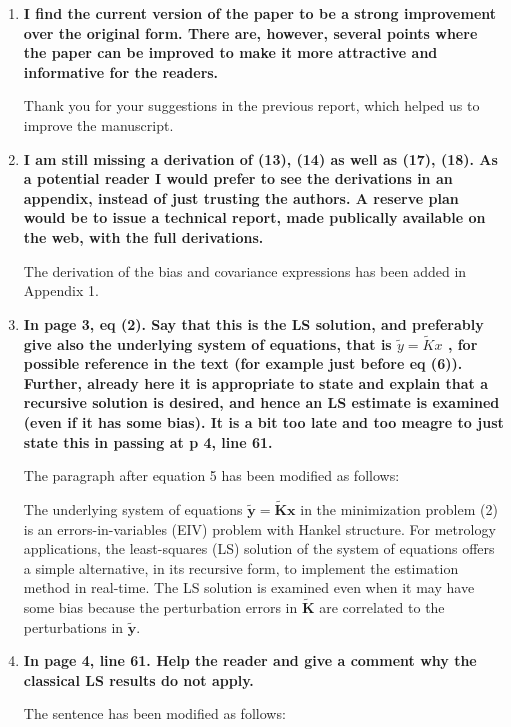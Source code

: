 \documentclass[11pt]{article}
\begin{document}
\begin{enumerate}


\item \textbf{I find the current version of the paper to be a strong improvement over the original form. There are, however, several points where the paper can be improved to make it more attractive and informative for the readers.}

Thank you for your suggestions in the previous report, which helped us to improve the manuscript.

\item \textbf{I am still missing a derivation of (13), (14) as well as (17), (18). As a potential
reader I would prefer to see the derivations in an appendix, instead of just
trusting the authors. A reserve plan would be to issue a technical report,
made publically available on the web, with the full derivations.}

The derivation of the bias and covariance expressions has been added in Appendix 1.

\item \textbf{In page 3, eq (2). Say that this is the LS solution, and preferably give also the underlying system of equations, that is $\tilde{y}=\tilde{K}x$ , for possible reference in the text (for example just before eq (6)). Further, already here it is appropriate to state and explain that a recursive solution is desired, and hence an LS estimate is examined (even if it has some bias). It is a bit too late and too meagre to just state this in passing at p 4, line 61.}

The paragraph after equation 5 has been modified as follows:

\color{blue} 
The underlying system of equations $\widetilde{\mathbf{y}} = \widetilde{\mathbf{K}} \mathbf{x}$ in the minimization problem (2)  is an errors-in-variables (EIV) problem with Hankel structure.
For metrology applications, the least-squares (LS) solution of the system of equations offers a simple alternative, in its recursive form, to implement the estimation method in real-time.
The LS solution is examined even when it may have some bias because the perturbation errors in $\widetilde{\mathbf{K}}$ are correlated to the perturbations in $\widetilde{\mathbf{y}}$.
\color{black}

\item \textbf{In page 4, line 61. Help the reader and give a comment why the classical LS results do not apply.}

The sentence has been modified as follows:


\end{enumerate}
\end{document}
